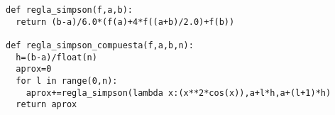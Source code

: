 \begin{center}
\begin{footnotesize}
\begin{verbatim}
def regla_simpson(f,a,b):
  return (b-a)/6.0*(f(a)+4*f((a+b)/2.0)+f(b))
  
def regla_simpson_compuesta(f,a,b,n):
  h=(b-a)/float(n)
  aprox=0
  for l in range(0,n):
    aprox+=regla_simpson(lambda x:(x**2*cos(x)),a+l*h,a+(l+1)*h)
  return aprox
\end{verbatim}
\end{footnotesize}
\end{center}

